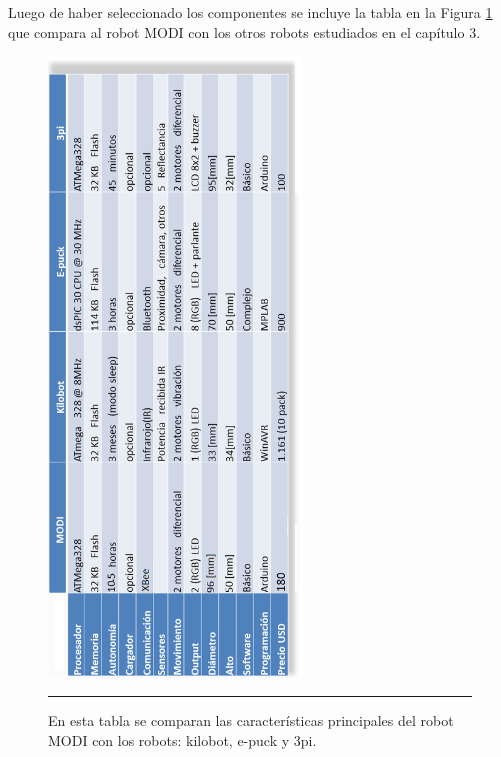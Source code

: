Luego de haber seleccionado los componentes se incluye la tabla en la Figura \ref{fig:Tabla robots MODI} que compara al robot MODI con los otros robots estudiados en el capítulo 3.

\begin{figure}[htbp]
	\centering
		\includegraphics[width=0.6\textwidth]{./Figures/tabla_robots_modi.png}
		\rule{35em}{0.5pt}
	\caption[Tabla comparativa robots MODI]{En esta tabla se comparan las características principales del robot MODI con los robots: kilobot, e-puck y 3pi.}
	\label{fig:Tabla robots MODI}
\end{figure}